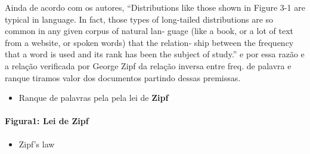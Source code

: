 \documentclass[]{article}
\newenvironment{Shaded}{\begin{snugshade}}{\end{snugshade}}
\newcommand{\KeywordTok}[1]{\textcolor[rgb]{0.13,0.29,0.53}{\textbf{#1}}}
\newcommand{\DataTypeTok}[1]{\textcolor[rgb]{0.13,0.29,0.53}{#1}}
\newcommand{\FloatTok}[1]{\textcolor[rgb]{0.00,0.00,0.81}{#1}}
\newcommand{\StringTok}[1]{\textcolor[rgb]{0.31,0.60,0.02}{#1}}
\newcommand{\CommentTok}[1]{\textcolor[rgb]{0.56,0.35,0.01}{\textit{#1}}}
\newcommand{\OtherTok}[1]{\textcolor[rgb]{0.56,0.35,0.01}{#1}}
\newcommand{\OperatorTok}[1]{\textcolor[rgb]{0.81,0.36,0.00}{\textbf{#1}}}
\newcommand{\NormalTok}[1]{#1}
\providecommand{\tightlist}{%
  \setlength{\itemsep}{0pt}\setlength{\parskip}{0pt}}
\let\oldparagraph\paragraph
\renewcommand{\paragraph}[1]{\oldparagraph{#1}\mbox{}}
\begin{document}
Ainda de acordo com os autores, ``Distributions like those shown in
Figure 3-1 are typical in language. In fact, those types of long-tailed
distributions are so common in any given corpus of natural lan‐ guage
(like a book, or a lot of text from a website, or spoken words) that the
relation‐ ship between the frequency that a word is used and its rank
has been the subject of study.'' e por essa razão e a relação verificada
por George Zipf da relação inversa entre freq. de palavra e ranque
tiramos valor dos documentos partindo dessas premissas.

\begin{itemize}
\tightlist
\item
  Ranque de palavras pela pela lei de \textbf{Zipf}
\end{itemize}

\begin{Shaded}
\end{Shaded}

\paragraph{Figura1: Lei de Zipf}\label{figura1-lei-de-zipf}

\begin{itemize}
\tightlist
\item
  Zipf's law
\end{itemize}

\begin{Shaded}
\end{Shaded}
\end{document}
